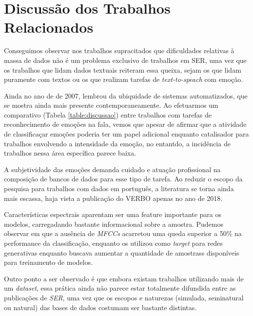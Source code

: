 \section{Discussão dos Trabalhos Relacionados}

Conseguimos observar nos trabalhos supracitados que dificuldades relativas à massa de dados não é um problema exclusivo de trabalhos em SER, uma vez que os trabalhos que lidam dados textuais reiteram essa queixa, sejam os que lidam puramente com textos ou os que realizam tarefas de \textit{text-to-speach} com emoção.

Ainda no ano de de 2007, \cite{32.32} lembrou da ubiquidade de sistemas automatizados, que se mostra ainda mais presente contemporaneamente. Ao efetuarmos um comparativo (Tabela \ref{table:discussao}) entre trabalhos com tarefas de reconhecimento de emoções na fala, vemos que apesar de \cite{14} afirmar que a atividade de classificaçar emoções poderia ter um papel adicional enquanto catalisador para trabalhos envolvendo a intensidade da emoção, no entantdo, a incidência de trabalhos nessa área específica parece baixa.

A subjetividade das emoções demanda cuidado e atuação profissional na composição de bancos de dados para esse tipo de tarefa. Ao reduzir o escopo da pesquisa para trabalhos com dados em português, a literatura se torna ainda mais escassa, haja vista a publicação do VERBO apenas no ano de 2018.

Características espectrais aparentam ser uma feature importante para os modelos, carregadando bastante informacional sobre a amostra. Pudemos observar em \cite{11} que a ausência de \textit{MFCCs} acarretou uma queda superior a 50\% na performance da classificação, enquanto \cite{34} os utilizou como \textit{target} para redes generativas enquanto buscava aumentar a quantidade de amostrass disponíveis para treinamento de modelos.

Outro ponto a ser observado é que embora existam trabalhos utilizando mais de um \textit{dataset}, essa prática ainda não parece estar totalmente difundida entre as publicações de \textit{SER}, uma vez que os escopos e naturezas (simulada, seminatural ou natural) das bases de dados costumam ser bastante distintas.

